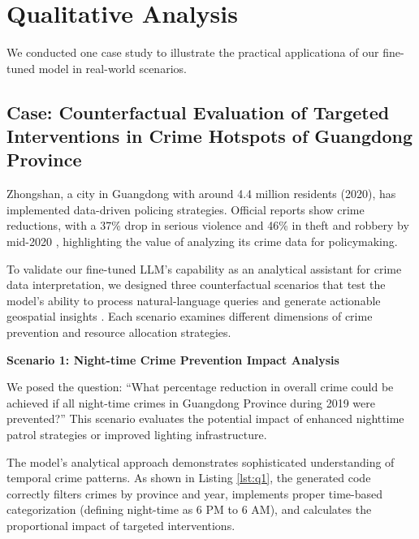 \section{Qualitative Analysis}

We conducted one case study to illustrate the practical applicationa of our fine-tuned model in real-world scenarios. 


\subsection{Case: Counterfactual Evaluation of Targeted Interventions in Crime Hotspots of Guangdong Province}

Zhongshan, a city in Guangdong with around 4.4 million residents (2020), has implemented data-driven policing strategies. Official reports show crime reductions, with a 37\% drop in serious violence and 46\% in theft and robbery by mid-2020 \cite{Zhongshan2020}, highlighting the value of analyzing its crime data for policymaking.

To validate our fine-tuned LLM's capability as an analytical assistant for crime data interpretation, we designed three counterfactual scenarios that test the model's ability to process natural-language queries and generate actionable geospatial insights \cite{William2025}. Each scenario examines different dimensions of crime prevention and resource allocation strategies.



\noindent \textbf{Scenario 1: Night-time Crime Prevention Impact Analysis}

We posed the question: ``What percentage reduction in overall crime could be achieved if all night-time crimes in Guangdong Province during 2019 were prevented?'' This scenario evaluates the potential impact of enhanced nighttime patrol strategies or improved lighting infrastructure.

The model's analytical approach demonstrates sophisticated understanding of temporal crime patterns. As shown in Listing \ref{lst:q1}, the generated code correctly filters crimes by province and year, implements proper time-based categorization (defining night-time as 6 PM to 6 AM), and calculates the proportional impact of targeted interventions.



